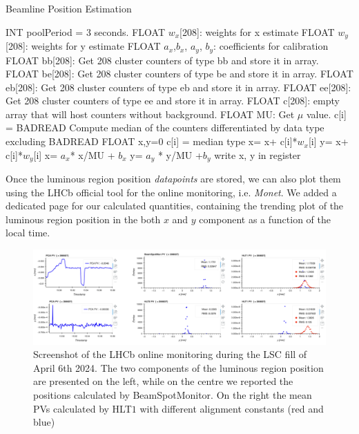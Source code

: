\begin{algorithm}
\caption{Beamline Position Estimation}\label{alg:beamline}
\begin{algorithmic}[1]
\ENSURE  INT poolPeriod = 3 seconds.
\ENSURE  FLOAT $w_x$[208]: weights for x estimate
\ENSURE  FLOAT $w_y$[208]: weights for y estimate
\ENSURE  FLOAT $a_x$,$ b_x$, $a_y$, $b_y$: coefficients for calibration 
        \STATE FLOAT  bb[208]: Get 208 cluster counters of type bb and store it in array.
        \STATE FLOAT  be[208]: Get 208 cluster counters of type be and store it in array.
        \STATE FLOAT  eb[208]: Get 208 cluster counters of type eb and store it in array.
        \STATE FLOAT  ee[208]: Get 208 cluster counters of type ee and store it in array.
        \STATE FLOAT c[208]: empty array that will host counters without background.
        \STATE FLOAT MU: Get $\mu$ value.
        \ELSE
        \STATE c[i] = BADREAD
        \ENDIF
        \ENDFOR
        \STATE Compute median of the counters differentiated by data type excluding BADREAD 
        \STATE FLOAT x,y=0
            \STATE c[i] = median type 
        \ENDIF
        \STATE x= x+ c[i]*$w_x$[i]
        \STATE y= x+ c[i]*$w_y$[i]
        \ENDFOR
        \STATE x= $a_x$* x/MU + $b_x$
        \STATE y= $a_y$ * y/MU +$b_y$
        \STATE write x, y in register
        \ENDIF
    \ENDIF
\ENDWHILE
\end{algorithmic}
\end{algorithm}


Once the luminous region position \textit{datapoints} are stored, we can also plot them using the LHCb official tool for the online monitoring, i.e. \textit{Monet}. We added a dedicated page for our calculated quantities, containing the trending plot of the luminous region position in the both $x$ and $y$ component as a function of the local time.

\begin{figure}
    \centering
    \includegraphics[width=\textwidth]{figures/Monet_beamline_screen.png}
    \caption{Screenshot of the LHCb online monitoring during the LSC fill of April 6th 2024. The two components of the luminous region position are presented on the left, while on the centre we reported the positions calculated by BeamSpotMonitor. On the right the mean PVs calculated by HLT$1$ with different alignment constants (red and blue)}
    \label{fig:monet_beamline}
\end{figure}

